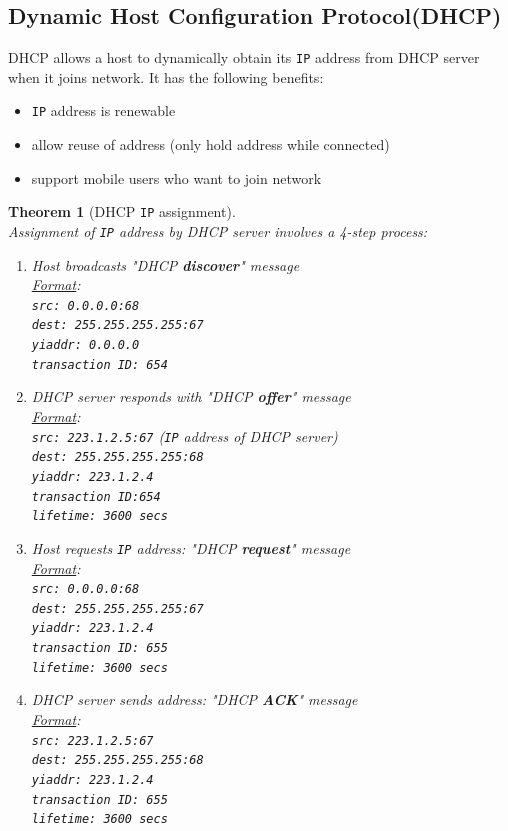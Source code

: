 \documentclass[12pt]{article}
\newcommand\IP{\texttt{IP} }
\newtheorem{theorem}{Theorem}[section]
\theoremstyle{definition}
\begin{document}
\subsection{Dynamic Host Configuration Protocol(DHCP)}
DHCP allows a host to dynamically obtain its \IP address from DHCP server when it joins network. It has the following benefits:
\begin{itemize}
  \item \IP address is renewable
  \item allow reuse of address (only hold address while connected)
  \item support mobile users who want to join network
\end{itemize}
\begin{theorem}[DHCP \IP assignment]\hfill\\\normalfont
Assignment of \IP address by DHCP server involves a 4-step process:
\begin{enumerate}
  \item Host broadcasts "DHCP \textbf{discover}" message\\
  \underline{Format}:\\
  \texttt{src: 0.0.0.0:68}\\
  \texttt{dest: 255.255.255.255:67}\\
  \texttt{yiaddr: 0.0.0.0}\\
  \texttt{transaction ID: 654}
  \item DHCP server responds with "DHCP \textbf{offer}" message\\
  \underline{Format}:\\
  \texttt{src: 223.1.2.5:67} (\IP address of DHCP server)\\
  \texttt{dest: 255.255.255.255:68}\\
  \texttt{yiaddr: 223.1.2.4}\\
  \texttt{transaction ID:654}\\
  \texttt{lifetime: 3600 secs}
  \item Host requests \IP address: "DHCP \textbf{request}" message\\
  \underline{Format}:\\
  \texttt{src: 0.0.0.0:68}\\
  \texttt{dest: 255.255.255.255:67}\\
  \texttt{yiaddr: 223.1.2.4}\\
  \texttt{transaction ID: 655}\\
  \texttt{lifetime: 3600 secs}
  \item DHCP server sends address: "DHCP \textbf{ACK}" message\\
  \underline{Format}:\\
  \texttt{src: 223.1.2.5:67}\\
  \texttt{dest: 255.255.255.255:68}\\
  \texttt{yiaddr: 223.1.2.4}\\
  \texttt{transaction ID: 655}\\
  \texttt{lifetime: 3600 secs}
\end{enumerate}
\end{theorem}
\end{document}
